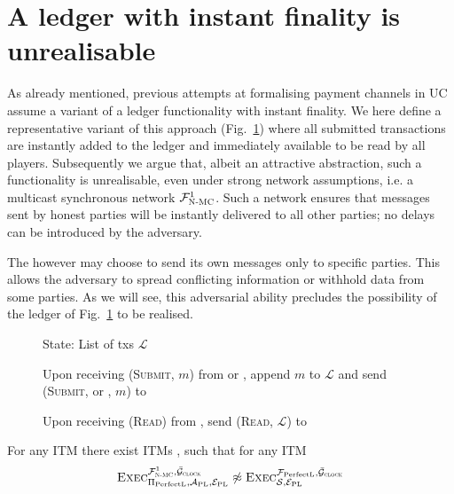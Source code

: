 \section{A ledger with instant finality is unrealisable}
\label{sec:perfect-ledger}
  As already mentioned, previous attempts at formalising payment channels in
  UC~\cite{DBLP:conf/ccs/DziembowskiFH18,Malavolta:2017:CPP:3133956.3134096,sprites,perun}
  assume a variant of a ledger functionality with instant finality. We here
  define a representative variant of this approach \perfectledger{}
  (Fig.~\ref{fig:perfectledger:func}) where all submitted transactions are
  instantly added to the ledger and immediately available to be read by all
  players. Subsequently we argue that, albeit an attractive abstraction, such a
  functionality is unrealisable, even under strong network assumptions, i.e. a
  multicast synchronous network $\mathcal{F}_{\textsc{N-MC}}^1$. Such a network ensures that
  messages sent by honest parties will be instantly delivered to all other
  parties; no delays can be introduced by the adversary. 

  The  however may choose to send its own messages only to
  specific parties. This allows the adversary to spread conflicting information
  or withhold data from some parties. As we will see, this adversarial ability
  precludes the possibility of the ledger of Fig.~\ref{fig:perfectledger:func}
  to be realised.

  \begin{figure}[H]
    \begin{systembox}{\perfectledger}
      \begin{algorithmic}[1]
        \State State: List of txs $\mathcal{L}$
        \Statex

        \State Upon receiving (\textsc{Submit}, $m$) from \alice{} or
        \adversary, append $m$ to $\mathcal{L}$ and send (\textsc{Submit},
        \alice{} or \adversary, $m$) to \adversary
        \Statex

        \State Upon receiving (\textsc{Read}) from \alice, send (\textsc{Read},
        $\mathcal{L}$) to \alice
      \end{algorithmic}
    \end{systembox}
    \caption{}
    \label{fig:perfectledger:func}
  \end{figure}

  \begin{theorem}
    \label{theorem:perfectledger}
    For any ITM \perfectprot{} there exist ITMs \perfectenv,
    \perfectadv{} such that for any ITM \simulator
    \begin{equation*}
      \textsc{Exec}^{\FnetworkEd^1, \gFclock}_{\perfectprot,
      \redden{\perfectadv, \perfectenv}} \not\approx
      \textsc{Exec}^{\perfectledger, \gFclock}_{\simulator,
      \redden{\perfectenv}}
    \end{equation*}
  \end{theorem}

